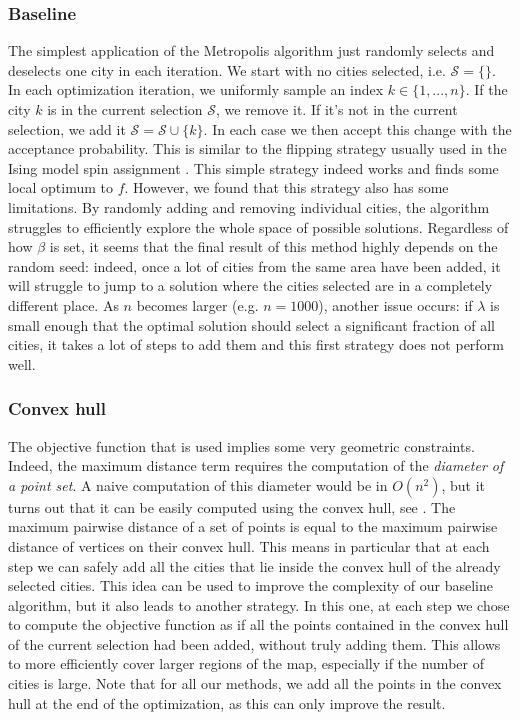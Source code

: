 \documentclass[conference,compsoc]{IEEEtran}
\newcommand{\selected}{\mathcal{S}}
\begin{document}
\subsubsection{Baseline}
The simplest application of the Metropolis algorithm just randomly selects and
deselects one city in each iteration. We start with no cities selected, i.e.
$\selected = \lbrace \rbrace$. In each optimization iteration, we uniformly
sample an index $k \in \lbrace 1, ..., n \rbrace$. If the city $k$ is in the
current selection $\selected$, we remove it. If it's not in the current
selection, we add it $\selected = \selected \cup \lbrace k \rbrace$. In each
case we then accept this change with the acceptance probability. This is similar
to the flipping strategy usually used in the Ising model spin assignment
\cite{newman1999monte}. This simple strategy indeed works and finds some local
optimum to $f$. However, we found that this strategy also has some limitations.
By randomly adding and removing individual cities, the algorithm struggles to
efficiently explore the whole space of possible solutions. Regardless of how
$\beta$ is set, it seems that the final result of this method highly depends on
the random seed: indeed, once a lot of cities from the same area have been
added, it will struggle to jump to a solution where the cities selected are in a
completely different place. As $n$ becomes larger (e.g. $n=1000$), another issue
occurs: if $\lambda$ is small enough that the optimal solution should select a
significant fraction of all cities, it takes a lot of steps to add them and this
first strategy does not perform well.

\subsubsection{Convex hull}
The objective function that is used implies some very geometric constraints.
Indeed, the maximum distance term requires the computation of the
\textit{diameter of a point set}. A naive computation of this diameter would be
in $O(n^2)$, but it turns out that it can be easily computed using the convex
hull, see \cite{diameter}. The maximum pairwise distance of a set of points is
equal to the maximum pairwise distance of vertices on their convex hull. This
means in particular that at each step we can safely add all the cities that lie
inside the convex hull of the already selected cities. This idea can be used to
improve the complexity of our baseline algorithm, but it also leads to another
strategy. In this one, at each step we chose to compute the objective function
as if all the points contained in the convex hull of the current selection had
been added, without truly adding them. This allows to more efficiently cover
larger regions of the map, especially if the number of cities is large. Note
that for all our methods, we add all the points in the convex hull at the end of
the optimization, as this can only improve the result.
\end{document}
